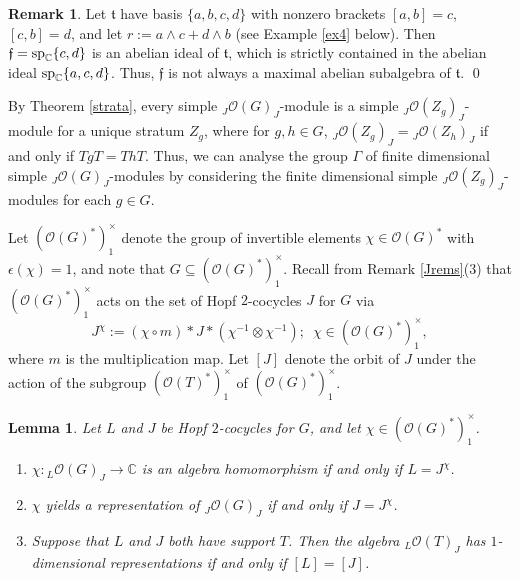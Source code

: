 \documentclass{amsart}
\numberwithin{equation}{section}
\newtheorem{lemma}[theorem]{Lemma}
\theoremstyle{definition}
\newtheorem{remark}[theorem]{Remark}
\begin{document}
\begin{remark}\label{FRemarks}
Let $\mathfrak{t}$ have basis $\{a,b,c,d\}$ with nonzero brackets $[a,b]=c$, $[c,b]=d$, and let $r:=a\wedge c + d\wedge b$ (see Example \ref{ex4} below). Then $\mathfrak{f}= {\rm sp}_{\mathbb{C}}\{c,d\}$ is an abelian ideal of $\mathfrak{t}$, which is strictly contained in the abelian ideal ${\rm sp}_{\mathbb{C}}\{a,c,d\}$. Thus, $\mathfrak{f}$ is not always a maximal abelian subalgebra of $\mathfrak{t}$. \qed
\end{remark}

By Theorem \ref{strata}, every simple ${}_J\mathcal{O}(G)_J$-module is a simple ${}_J\mathcal{O}(Z_g)_J$-module for a unique stratum $Z_g$, where for $g,h \in G$, 
${}_J\mathcal{O}(Z_g)_J = {}_J\mathcal{O}(Z_h)_J$ if and only if $TgT = ThT$. Thus, we can analyse the group $\Gamma$ of finite dimensional simple ${}_J\mathcal{O}(G)_J$-modules by considering the finite dimensional simple ${}_J\mathcal{O}(Z_g)_J$-modules for each $g \in G$.

Let $(\mathcal{O}(G)^*)_1^{\times}$ denote the group of invertible elements $\chi\in \mathcal{O}(G)^*$ with $\epsilon(\chi)=1$, and note that $G \subseteq (\mathcal{O}(G)^*)_1^{\times}$. 
Recall from Remark \ref{Jrems}(3) that $(\mathcal{O}(G)^*)_1^{\times}$ acts on the set of Hopf $2$-cocycles $J$ for $G$ via 
$$J^{\chi}:=(\chi\circ m)*J*\left(\chi^{-1}\otimes \chi^{-1}\right);\,\,\,\chi\in \left(\mathcal{O}(G)^*\right)_1^{\times},$$ 
where $m$ is the multiplication map. Let $[J]$ denote the orbit of $J$ under the action of the subgroup $(\mathcal{O}(T)^*)_1^{\times}$ of $(\mathcal{O}(G)^*)_1^{\times}$.

\begin{lemma}\label{alghomIJ}
Let $L$ and $J$ be Hopf $2$-cocycles for $G$, and let $\chi \in (\mathcal{O}(G)^*)_1^{\times}$. 
\begin{enumerate}
\item $\chi:{}_L \mathcal{O}(G)_J\to \mathbb{C}$ is an algebra homomorphism if and only if $L=J^{\chi}$. 
\item $\chi$ yields a representation of ${}_J\mathcal{O}(G)_J$ if and only if $J = J^{\chi}$.
\item Suppose that $L$ and $J$ both have support $T$. Then the algebra ${}_L\mathcal{O}(T)_J$ has $1$-dimensional representations if and only if $[L] = [J]$.
\end{enumerate}
\end{lemma}
\end{document}
